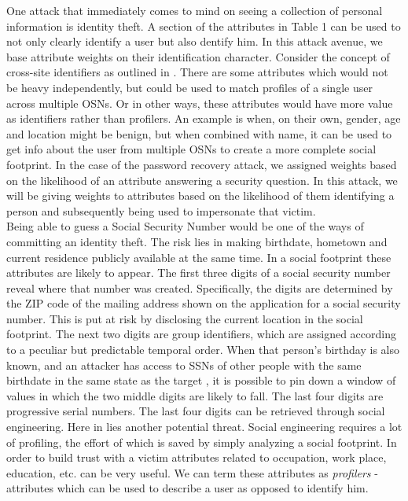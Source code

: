 \documentclass[10pt,conference]{IEEEtran}
\begin{document}
One attack that immediately comes to mind on seeing a collection of personal information is identity theft. A section of the attributes in Table 1 can be used to not only clearly identify a user but also dentify him. In this attack avenue, we base attribute weights on their identification character. Consider the concept of cross-site identifiers as outlined in \cite{emergingthreat}. There are some attributes which would not be heavy independently, but could be used to match profiles of a single user across multiple OSNs. Or in other ways, these attributes would have more value as identifiers rather than profilers. An example is when, on their own, gender, age and location might be benign, but when combined with name, it can be used to get info about the user from multiple OSNs to create a more complete social footprint. In the case of the password recovery attack, we assigned weights based on the likelihood of an attribute answering a security question. In this attack, we will be giving weights to attributes based on the likelihood of them identifying a person and subsequently being used to impersonate that victim.\\

Being able to guess a Social Security Number would be one of the ways of committing an identity theft. The risk lies in making birthdate, hometown and current residence publicly available at the same time. In a social footprint these attributes are likely to appear. The first three digits of a social security number reveal where that number was created. Specifically, the digits are determined by the ZIP code of the mailing address shown on the application for a social security number. This is put at risk by disclosing the current location in the social footprint. The next two digits are group identifiers, which are assigned according to a peculiar but predictable temporal order. When that person’s birthday is also known, and an attacker has access to SSNs of other people with the same birthdate in the same state as the target , it is possible to pin down a window of values in which the two middle digits are likely to fall. The last four digits are progressive serial numbers. The last four digits can be retrieved through social engineering. Here in lies another potential threat. Social engineering requires a lot of profiling, the effort of which is saved by simply analyzing a social footprint. In order to build trust with a victim attributes related to occupation, work place, education, etc. can be very useful. We can term these attributes as \textit{profilers} - attributes which can be used to describe a user as opposed to identify him.
 
\end{document}
